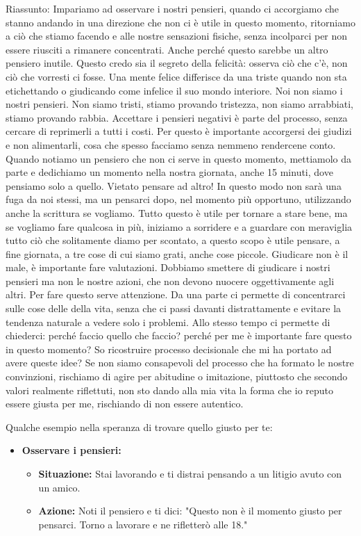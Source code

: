 \documentclass[12pt]{book} %
\begin{document}
\begin{mdframed}[linewidth=1pt]
Riassunto: Impariamo ad osservare i nostri pensieri, quando ci accorgiamo che stanno andando in una direzione che non ci è utile in questo momento, ritorniamo a ciò che stiamo facendo e alle nostre sensazioni fisiche, senza incolparci per non essere riusciti a rimanere concentrati. Anche perché questo sarebbe un altro pensiero inutile. Questo credo sia il segreto della felicità: osserva ciò che c'è, non ciò che vorresti ci fosse. Una mente felice differisce da una triste quando non sta etichettando o giudicando come infelice il suo mondo interiore. Noi non siamo i nostri pensieri. Non siamo tristi, stiamo provando tristezza, non siamo arrabbiati, stiamo provando rabbia. Accettare i pensieri negativi è parte del processo, senza cercare di reprimerli a tutti i costi. Per questo è importante accorgersi dei giudizi e non alimentarli, cosa che spesso facciamo senza nemmeno rendercene conto.
Quando notiamo un pensiero che non ci serve in questo momento, mettiamolo da parte e dedichiamo un momento nella nostra giornata, anche 15 minuti, dove pensiamo solo a quello. Vietato pensare ad altro! In questo modo non sarà una fuga da noi stessi, ma un pensarci dopo, nel momento più opportuno, utilizzando anche la scrittura se vogliamo. Tutto questo è utile per tornare a stare bene, ma se vogliamo fare qualcosa in più, iniziamo a sorridere e a guardare con meraviglia tutto ciò che solitamente diamo per scontato, a questo scopo è utile pensare, a fine giornata, a tre cose di cui siamo grati, anche cose piccole.
Giudicare non è il male, è importante fare valutazioni. Dobbiamo smettere di giudicare i nostri pensieri ma non le nostre azioni, che non devono nuocere oggettivamente agli altri.
Per fare questo serve attenzione. Da una parte ci permette di concentrarci sulle cose delle della vita, senza che ci passi davanti distrattamente e evitare la tendenza naturale a vedere solo i problemi. Allo stesso tempo ci permette di chiederci: perché faccio quello che faccio? perché per me è importante fare questo in questo momento? So ricostruire processo decisionale che mi ha portato ad avere queste idee? Se non siamo consapevoli del processo che ha formato le nostre convinzioni, rischiamo di agire per abitudine o imitazione, piuttosto che secondo valori realmente riflettuti, non sto dando alla mia vita la forma che io reputo essere giusta per me, rischiando di non essere autentico.

Qualche esempio nella speranza di trovare quello giusto per te:
\begin{itemize}
    \item \textbf{Osservare i pensieri:} 
    \begin{itemize}
        \item \textbf{Situazione:} Stai lavorando e ti distrai pensando a un litigio avuto con un amico.
        \item \textbf{Azione:} Noti il pensiero e ti dici: "Questo non è il momento giusto per pensarci. Torno a lavorare e ne rifletterò alle 18."
    \end{itemize}


\end{itemize}
\end{mdframed}
\end{document}
